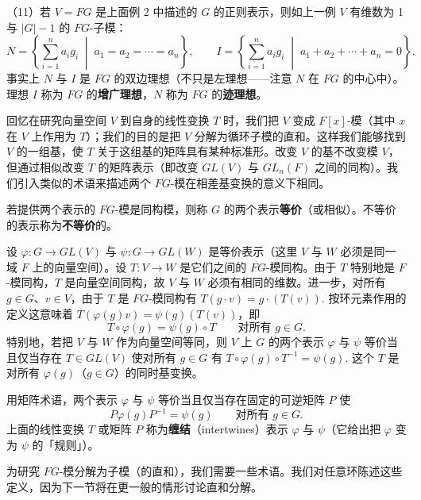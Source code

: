 （11）若 \(V = FG\) 是上面例 2 中描述的 \(G\) 的正则表示，则如上一例 \(V\) 有维数为 1 与 \(|G|-1\) 的 \(FG\)-子模：
\[
N = \left\{\sum_{i=1}^{n}a_ig_i \;\middle|\; a_1 = a_2 = \cdots = a_n\right\}, \qquad I = \left\{\sum_{i=1}^{n}a_ig_i \;\middle|\; a_1+a_2+\cdots+a_n = 0\right\}.
\]
事实上 \(N\) 与 \(I\) 是 \(FG\) 的双边理想（不只是左理想——注意 \(N\) 在 \(FG\) 的中心中）。理想 \(I\) 称为 \(FG\) 的\textbf{增广理想}，\(N\) 称为 \(FG\) 的\textbf{迹理想}。

回忆在研究向量空间 \(V\) 到自身的线性变换 \(T\) 时，我们把 \(V\) 变成 \(F[x]\)-模（其中 \(x\) 在 \(V\) 上作用为 \(T\)）；我们的目的是把 \(V\) 分解为循环子模的直和。这样我们能够找到 \(V\) 的一组基，使 \(T\) 关于这组基的矩阵具有某种标准形。改变 \(V\) 的基不改变模 \(V\)，但通过相似改变 \(T\) 的矩阵表示（即改变 \(GL(V)\) 与 \(GL_n(F)\) 之间的同构）。我们引入类似的术语来描述两个 \(FG\)-模在相差基变换的意义下相同。

\begin{definition}
若提供两个表示的 \(FG\)-模是同构模，则称 \(G\) 的两个表示\textbf{等价}（或相似）。不等价的表示称为\textbf{不等价}的。
\end{definition}

设 \(\varphi : G \to GL(V)\) 与 \(\psi : G \to GL(W)\) 是等价表示（这里 \(V\) 与 \(W\) 必须是同一域 \(F\) 上的向量空间）。设 \(T : V \to W\) 是它们之间的 \(FG\)-模同构。由于 \(T\) 特别地是 \(F\)-模同构，\(T\) 是向量空间同构，故 \(V\) 与 \(W\) 必须有相同的维数。进一步，对所有 \(g \in G\)、\(v \in V\)，由于 \(T\) 是 \(FG\)-模同构有 \(T(g \cdot v) = g \cdot (T(v))\). 按环元素作用的定义这意味着 \(T(\varphi(g)v) = \psi(g)(T(v))\)，即
\[
T \circ \varphi(g) = \psi(g) \circ T \qquad \text{对所有 } g \in G.
\]
特别地，若把 \(V\) 与 \(W\) 作为向量空间等同，则 \(V\) 上 \(G\) 的两个表示 \(\varphi\) 与 \(\psi\) 等价当且仅当存在 \(T \in GL(V)\) 使对所有 \(g \in G\) 有 \(T \circ \varphi(g) \circ T^{-1} = \psi(g)\). 这个 \(T\) 是对所有 \(\varphi(g)\)（\(g \in G\)）的同时基变换。

用矩阵术语，两个表示 \(\varphi\) 与 \(\psi\) 等价当且仅当存在固定的可逆矩阵 \(P\) 使
\[
P\varphi(g)P^{-1} = \psi(g) \qquad \text{对所有 } g \in G.
\]
上面的线性变换 \(T\) 或矩阵 \(P\) 称为\textbf{缠结}（intertwines）表示 \(\varphi\) 与 \(\psi\)（它给出把 \(\varphi\) 变为 \(\psi\) 的「规则」）。

为研究 \(FG\)-模分解为子模（的直和），我们需要一些术语。我们对任意环陈述这些定义，因为下一节将在更一般的情形讨论直和分解。


